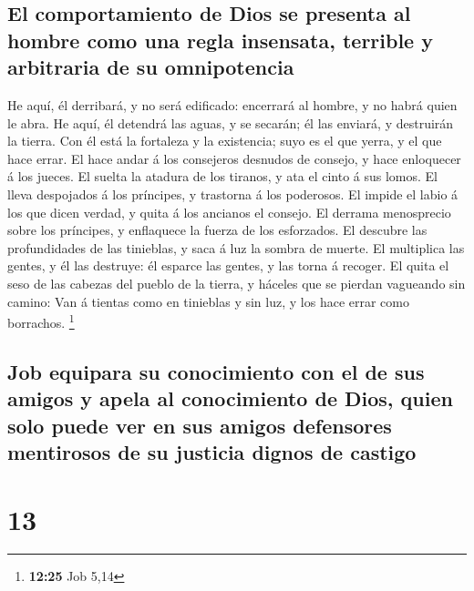 \hypertarget{el-comportamiento-de-dios-se-presenta-al-hombre-como-una-regla-insensata-terrible-y-arbitraria-de-su-omnipotencia}{%
\subsection{El comportamiento de Dios se presenta al hombre como una
regla insensata, terrible y arbitraria de su
omnipotencia}\label{el-comportamiento-de-dios-se-presenta-al-hombre-como-una-regla-insensata-terrible-y-arbitraria-de-su-omnipotencia}}

 He aquí, él derribará, y no será edificado: encerrará al
hombre, y no habrá quien le abra.  He aquí, él detendrá las
aguas, y se secarán; él las enviará, y destruirán la tierra.
 Con él está la fortaleza y la existencia; suyo es el que
yerra, y el que hace errar.  El hace andar á los consejeros
desnudos de consejo, y hace enloquecer á los jueces.  El
suelta la atadura de los tiranos, y ata el cinto á sus lomos.
 El lleva despojados á los príncipes, y trastorna á los
poderosos.  El impide el labio á los que dicen verdad, y
quita á los ancianos el consejo.  El derrama menosprecio
sobre los príncipes, y enflaquece la fuerza de los esforzados.
 El descubre las profundidades de las tinieblas, y saca á
luz la sombra de muerte.  El multiplica las gentes, y él
las destruye: él esparce las gentes, y las torna á recoger.
 El quita el seso de las cabezas del pueblo de la tierra, y
háceles que se pierdan vagueando sin camino:  Van á tientas
como en tinieblas y sin luz, y los hace errar como borrachos.
\footnote{\textbf{12:25} Job 5,14}

\hypertarget{job-equipara-su-conocimiento-con-el-de-sus-amigos-y-apela-al-conocimiento-de-dios-quien-solo-puede-ver-en-sus-amigos-defensores-mentirosos-de-su-justicia-dignos-de-castigo}{%
\subsection{Job equipara su conocimiento con el de sus amigos y apela al
conocimiento de Dios, quien solo puede ver en sus amigos defensores
mentirosos de su justicia dignos de
castigo}\label{job-equipara-su-conocimiento-con-el-de-sus-amigos-y-apela-al-conocimiento-de-dios-quien-solo-puede-ver-en-sus-amigos-defensores-mentirosos-de-su-justicia-dignos-de-castigo}}

\hypertarget{section-12}{%
\section{13}\label{section-12}}

